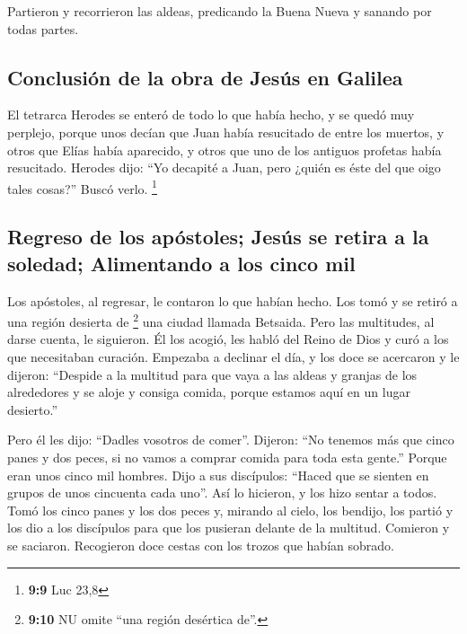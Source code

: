  Partieron y recorrieron las aldeas, predicando la Buena
Nueva y sanando por todas partes.

\hypertarget{conclusiuxf3n-de-la-obra-de-jesuxfas-en-galilea}{%
\subsection{Conclusión de la obra de Jesús en
Galilea}\label{conclusiuxf3n-de-la-obra-de-jesuxfas-en-galilea}}

 El tetrarca Herodes se enteró de todo lo que había hecho,
y se quedó muy perplejo, porque unos decían que Juan había resucitado de
entre los muertos,  y otros que Elías había aparecido, y
otros que uno de los antiguos profetas había resucitado. 
Herodes dijo: ``Yo decapité a Juan, pero ¿quién es éste del que oigo
tales cosas?'' Buscó verlo. \footnote{\textbf{9:9} Luc 23,8}

\hypertarget{regreso-de-los-apuxf3stoles-jesuxfas-se-retira-a-la-soledad-alimentando-a-los-cinco-mil}{%
\subsection{Regreso de los apóstoles; Jesús se retira a la soledad;
Alimentando a los cinco
mil}\label{regreso-de-los-apuxf3stoles-jesuxfas-se-retira-a-la-soledad-alimentando-a-los-cinco-mil}}

 Los apóstoles, al regresar, le contaron lo que habían
hecho. Los tomó y se retiró a una región desierta de \footnote{\textbf{9:10}
  NU omite ``una región desértica de''.} una ciudad llamada Betsaida.
 Pero las multitudes, al darse cuenta, le siguieron. Él
los acogió, les habló del Reino de Dios y curó a los que necesitaban
curación.  Empezaba a declinar el día, y los doce se
acercaron y le dijeron: ``Despide a la multitud para que vaya a las
aldeas y granjas de los alrededores y se aloje y consiga comida, porque
estamos aquí en un lugar desierto.''

 Pero él les dijo: ``Dadles vosotros de comer''. Dijeron:
``No tenemos más que cinco panes y dos peces, si no vamos a comprar
comida para toda esta gente.''  Porque eran unos cinco
mil hombres. Dijo a sus discípulos: ``Haced que se sienten en grupos de
unos cincuenta cada uno''.  Así lo hicieron, y los hizo
sentar a todos.  Tomó los cinco panes y los dos peces y,
mirando al cielo, los bendijo, los partió y los dio a los discípulos
para que los pusieran delante de la multitud.  Comieron y
se saciaron. Recogieron doce cestas con los trozos que habían sobrado.

